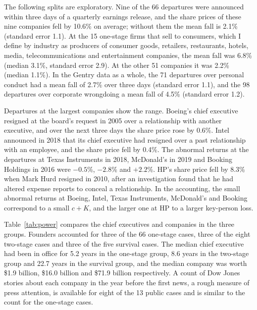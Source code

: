\documentclass[11pt,a4paper]{article}
\begin{document}
The following splits are exploratory. Nine of the 66 departures were announced within three days of a quarterly earnings release, and the share prices of these nine companies fell by 10.6\% on average; without them the mean fall is 2.1\% (standard error 1.1). At the 15 one-stage firms that sell to consumers, which I define by industry as producers of consumer goods, retailers, restaurants, hotels, media, telecommunications and entertainment companies, the mean fall was 6.8\% (median 3.1\%, standard error 2.9). At the other 51 companies it was 2.2\% (median 1.1\%). In the Gentry data as a whole, the 71 departures over personal conduct had a mean fall of 2.7\% over three days (standard error 1.1), and the 98 departures over corporate wrongdoing a mean fall of 4.5\% (standard error 1.2).

Departures at the largest companies show the range. Boeing's chief executive resigned at the board's request in 2005 over a relationship with another executive, and over the next three days the share price rose by 0.6\%. Intel announced in 2018 that its chief executive had resigned over a past relationship with an employee, and the share price fell by 0.4\%. The abnormal returns at the departures at Texas Instruments in 2018, McDonald's in 2019 and Booking Holdings in 2016 were $-0.5$\%, $-2.8$\% and $+2.2$\%. HP's share price fell by 8.3\% when Mark Hurd resigned in 2010, after an investigation found that he had altered expense reports to conceal a relationship. In the accounting, the small abnormal returns at Boeing, Intel, Texas Instruments, McDonald's and Booking correspond to a small $c + K$, and the larger one at HP to a larger key-person loss.

Table~\ref{tab:power} compares the chief executives and companies in the three groups. Founders accounted for three of the 66 one-stage cases, three of the eight two-stage cases and three of the five survival cases. The median chief executive had been in office for 5.2 years in the one-stage group, 8.6 years in the two-stage group and 22.7 years in the survival group, and the median company was worth \$1.9 billion, \$16.0 billion and \$71.9 billion respectively. A count of Dow Jones stories about each company in the year before the first news, a rough measure of press attention, is available for eight of the 13 public cases and is similar to the count for the one-stage cases.
\end{document}
